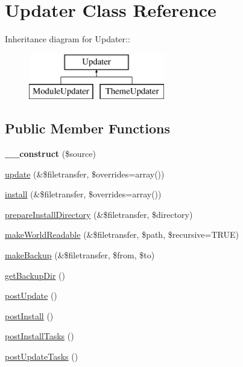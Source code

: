 \hypertarget{classUpdater}{
\section{Updater Class Reference}
\label{classUpdater}
}
Inheritance diagram for Updater::\begin{figure}[H]
\begin{center}
\leavevmode
\includegraphics[height=2cm]{classUpdater}
\end{center}
\end{figure}
\subsection*{Public Member Functions}
\begin{DoxyCompactItemize}
\item 
\hypertarget{classUpdater_a0e12354a02be64d98c2fd4a829df3a1c}{
{\bfseries \_\-\_\-construct} (\$source)}
\label{classUpdater_a0e12354a02be64d98c2fd4a829df3a1c}

\item 
\hyperlink{classUpdater_a3129525aef507bdf5c3f8abf278b8e88}{update} (\&\$filetransfer, \$overrides=array())
\item 
\hyperlink{classUpdater_ae48337676acbe63592adf17ed629c72a}{install} (\&\$filetransfer, \$overrides=array())
\item 
\hyperlink{classUpdater_a79c3ae76bfdfa5f763978196055086dd}{prepareInstallDirectory} (\&\$filetransfer, \$directory)
\item 
\hyperlink{classUpdater_a8218fada74db8a896a3a87ffc2d6f9bf}{makeWorldReadable} (\&\$filetransfer, \$path, \$recursive=TRUE)
\item 
\hyperlink{classUpdater_afdbf28100a8d3ed78cb97095fa221923}{makeBackup} (\&\$filetransfer, \$from, \$to)
\item 
\hyperlink{classUpdater_a0384d0bc433f259a81db0f61bd49d9c8}{getBackupDir} ()
\item 
\hyperlink{classUpdater_a68cf9e613e06963f0fa6d0f1779f36e7}{postUpdate} ()
\item 
\hyperlink{classUpdater_a5d46854a6a9fb7b22a71d6da5fdf0c8f}{postInstall} ()
\item 
\hyperlink{classUpdater_a59eb832c6bb80dd9f04fc85c8ebe8905}{postInstallTasks} ()
\item 
\hyperlink{classUpdater_a377feb2830d31884f8ff1ff152d94576}{postUpdateTasks} ()
\end{DoxyCompactItemize}
